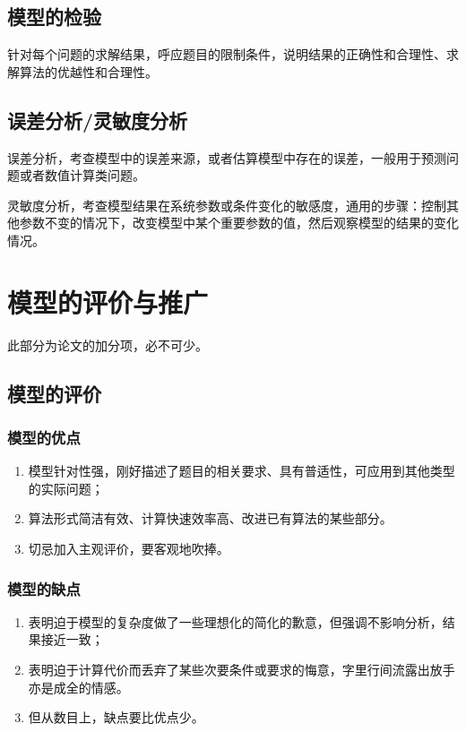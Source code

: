 \documentclass[12pt,utf8]{article}
\begin{document}
\subsection{模型的检验}

针对每个问题的求解结果，呼应题目的限制条件，说明结果的正确性和合理性、求解算法的优越性和合理性。

\subsection{误差分析/灵敏度分析}

误差分析，考查模型中的误差来源，或者估算模型中存在的误差，一般用于预测问题或者数值计算类问题。

灵敏度分析，考查模型结果在系统参数或条件变化的敏感度，通用的步骤：控制其他参数不变的情况下，改变模型中某个重要参数的值，然后观察模型的结果的变化情况。



\section{模型的评价与推广}

此部分为论文的加分项，必不可少。

\subsection{模型的评价}

\subsubsection{模型的优点}
\begin{enumerate}
\item 模型针对性强，刚好描述了题目的相关要求、具有普适性，可应用到其他类型的实际问题；
\item 算法形式简洁有效、计算快速效率高、改进已有算法的某些部分。
\item 切忌加入主观评价，要客观地吹捧。
\end{enumerate}

\subsubsection{模型的缺点}

\begin{enumerate}
\item 表明迫于模型的复杂度做了一些理想化的简化的歉意，但强调不影响分析，结果接近一致；
\item 表明迫于计算代价而丢弃了某些次要条件或要求的悔意，字里行间流露出放手亦是成全的情感。
\item 但从数目上，缺点要比优点少。
\end{enumerate}
\end{document}
